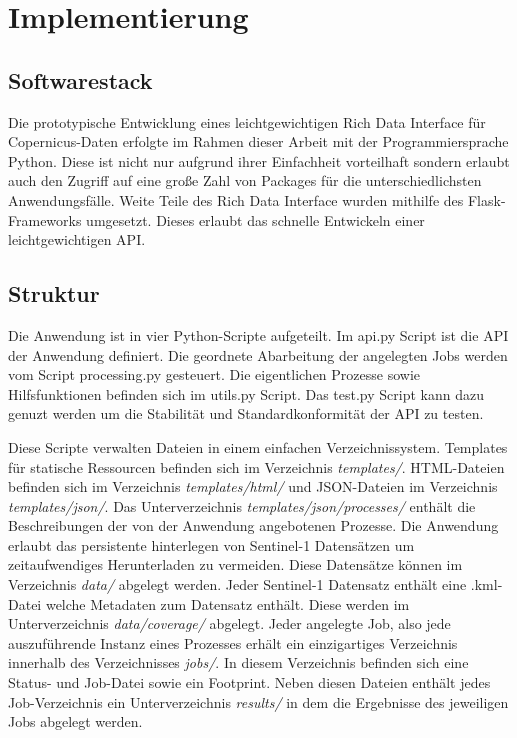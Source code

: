 \newpage
\restoregeometry
\section{Implementierung}
\subsection{Softwarestack}
Die prototypische Entwicklung eines leichtgewichtigen Rich Data Interface für Copernicus-Daten erfolgte im Rahmen dieser Arbeit mit der Programmiersprache Python.
Diese ist nicht nur aufgrund ihrer Einfachheit vorteilhaft sondern erlaubt auch den Zugriff auf eine große Zahl von Packages für die unterschiedlichsten 
Anwendungsfälle. 
Weite Teile des Rich Data Interface wurden mithilfe des Flask-Frameworks umgesetzt. Dieses erlaubt das schnelle Entwickeln einer leichtgewichtigen API.   

\subsection{Struktur}
Die Anwendung ist in vier Python-Scripte aufgeteilt. Im api.py Script ist die API der Anwendung definiert. 
Die geordnete Abarbeitung der angelegten Jobs werden vom Script processing.py gesteuert. Die eigentlichen Prozesse sowie 
Hilfsfunktionen befinden sich im utils.py Script. Das test.py Script kann dazu genuzt werden um die Stabilität und Standardkonformität der API zu testen.

Diese Scripte verwalten Dateien in einem einfachen Verzeichnissystem. Templates für statische Ressourcen befinden sich im Verzeichnis \textit{templates/}. HTML-Dateien 
befinden sich im Verzeichnis \textit{templates/html/} und JSON-Dateien im Verzeichnis \textit{templates/json/}. Das Unterverzeichnis \textit{templates/json/processes/} enthält die 
Beschreibungen der von der Anwendung angebotenen Prozesse. 
Die Anwendung erlaubt das persistente hinterlegen von Sentinel-1 Datensätzen um zeitaufwendiges Herunterladen zu vermeiden. Diese Datensätze können im Verzeichnis \textit{data/} abgelegt werden. Jeder Sentinel-1 Datensatz enthält eine .kml-Datei welche 
Metadaten zum Datensatz enthält. Diese werden im Unterverzeichnis \textit{data/coverage/} abgelegt. 
Jeder angelegte Job, also jede auszuführende Instanz eines Prozesses erhält ein einzigartiges Verzeichnis innerhalb des Verzeichnisses \textit{jobs/}. In diesem 
Verzeichnis befinden sich eine Status- und Job-Datei sowie ein Footprint. Neben diesen Dateien enthält jedes Job-Verzeichnis ein Unterverzeichnis \textit{results/} in dem
die Ergebnisse des jeweiligen Jobs abgelegt werden.

